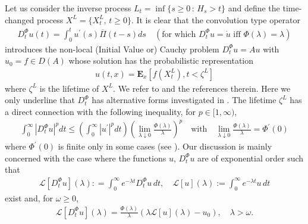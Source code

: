 \documentclass[[11pt,a4paper,reqno]{article}
\numberwithin{equation}{section}
\begin{document}
Let us consider the inverse process $L_t = \inf \{s \geq 0\,:\, H_s >t \}$ and define the time-changed process $X^L = \{X^L_t,\, t \geq 0\}$. It is clear that the convolution type operator
\begin{align*}
D^\Phi_t u(t) = \int_0^t u^\prime(s) \overline{\Pi}(t-s)ds \quad (\textrm{for which } D^\Phi_t u = \dot{u} \textrm{ iff } \Phi(\lambda)=\lambda )
\end{align*}
introduces the non-local (Initial Value or) Cauchy problem $D^\Phi_t u = A u$ with $u_0=f \in D(A)$ whose solution has the probabilistic representation  
\begin{align}
\label{sol-time-frac-problem}
u(t,x) = \mathbf{E}_x[f(X^{L}_t), t < \zeta^{L}]
\end{align}
where $\zeta^{L}$ is the lifetime of $X^L$. We refer to \cite{CapDovVIA} and the references therein. Here we only underline that $D^\Phi_t$ has alternative forms investigated in \cite{chen, kochubei, toaldo}. The lifetime $\zeta^L$ has a direct connection with the following inequality, for $p \in [1, \infty)$,
\begin{align}
\label{YoungSymb}
\int_0^\infty |D^\Phi_t u |^p dt \leq \left( \int_0^\infty |u^\prime |^p dt \right) \left( \lim_{\lambda \downarrow 0} \frac{\Phi(\lambda)}{\lambda} \right)^p \quad \textrm{with} \quad \lim_{\lambda \downarrow 0} \frac{\Phi(\lambda)}{\lambda} = \Phi^\prime(0)
\end{align}
where $\Phi^\prime(0)$ is finite only in some cases (see \cite{CapDovVIA}). Our discussion is mainly concerned with the case where the functions $u$, $D^\Phi_t u$ are of exponential order such that
\begin{align*}
\mathcal{L}[D^\Phi_t u](\lambda): = \int_0^\infty e^{-\lambda t} D^\Phi_t u\, dt, \quad \mathcal{L}[u](\lambda):= \int_0^\infty e^{-\lambda t} u\, dt
\end{align*}
exist and, for $\omega\geq 0$, 
\begin{align*}
\mathcal{L}[D^\Phi_t u](\lambda) = \frac{\Phi(\lambda)}{\lambda} \left( \lambda \mathcal{L}[u](\lambda) - u_0 \right), \quad \lambda > \omega.
\end{align*}
\end{document}
